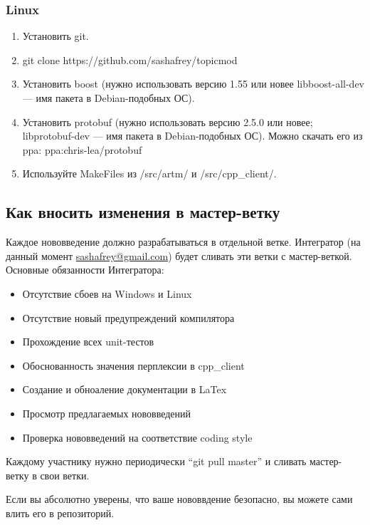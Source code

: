\documentclass[12pt]{article}
\begin{document}
\subsubsection{Linux}

\begin{enumerate}
    \item Установить git.
    \item git clone https://github.com/sashafrey/topicmod
    \item Установить boost (нужно использовать версию 1.55 или новее \hbox{libboost-all-dev} --- имя пакета в Debian-подобных ОС).
    \item Установить protobuf (нужно использовать версию 2.5.0 или новее; \hbox{libprotobuf-dev} --- имя пакета в Debian-подобных ОС). Можно скачать его из ppa: \hbox{ppa:chris-lea/protobuf}
    \item Используйте MakeFiles из /src/artm/ и /src/cpp\_client/.
\end{enumerate}

\subsection{Как вносить изменения в мастер-ветку}\label{label:how_to_submit}

Каждое нововведение должно разрабатываться в отдельной ветке. Интегратор (на данный момент \href{mailto:sashafrey@gmail.com}{sashafrey@gmail.com}) будет сливать эти ветки с мастер-веткой. Основные обязанности Интегратора:
\begin{itemize}
    \item Отсутствие сбоев на Windows и Linux
    \item Отсутствие новый предупреждений компилятора
    \item Прохождение всех unit-тестов
    \item Обоснованность значения перплексии в cpp\_client
    \item Создание и обноаление документации в LaTex
    \item Просмотр предлагаемых нововведений
    \item Проверка нововведений на соответствие coding style
\end{itemize}

Каждому участнику нужно периодически ``git pull master'' и сливать мастер-ветку в свои ветки.

Если вы абсолютно уверены, что ваше нововвдение безопасно, вы можете сами влить его в репозиторий.
\end{document}
